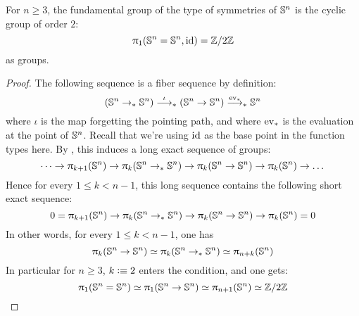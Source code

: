 \documentclass[english,a4paper]{lmcs}
\begin{document}
\begin{thm} \label{thm:fund-grp-of-symmetries}
    For $n \geq 3$, the fundamental group of the type of symmetries of ${\mathbb S^{n}}$ is the cyclic group of order $2$:
    \begin{equation}
    \uppi_{1}({\mathbb S^{n}} = {\mathbb S^{n}}, \mathord{\mathrm{id}}) = \mathbb{Z} \slash 2\mathbb{Z}
    \end{equation}
    as groups.
\end{thm}

\begin{proof}%
  The following sequence is a fiber sequence by definition:
  \begin{displaymath}
    ({\mathbb S^{n}} \to_\ast {\mathbb S^{n}}) \stackrel \iota \longrightarrow_\ast
    ({\mathbb S^{n}} \to {\mathbb S^{n}}) \stackrel {\mathrm{ev}_\ast} \longrightarrow_\ast {\mathbb S^{n}}
  \end{displaymath}
  where $\iota$ is the map forgetting the pointing path, and where $\mathrm{ev}_\ast$
  is the evaluation at the point of ${\mathbb S^{n}}$.
  Recall that we're using $\mathord{\mathrm{id}}$ as the base point in the function types here.
  By \cite[Theorem 8.4.6]{HoTT}, this
  induces a long exact sequence of groups:
  \begin{displaymath}
    \dots \to \uppi_{k+1} ({\mathbb S^{n}})
    \to \uppi_{k}({\mathbb S^{n}} \to_\ast {\mathbb S^{n}}) \to \uppi_{k}({\mathbb S^{n}} \to {\mathbb S^{n}}) \to \uppi_{k}({\mathbb S^{n}})
    \to \dots
  \end{displaymath}
  Hence for every $1\leq k < n-1$, this long sequence contains the following short exact sequence:
  \begin{displaymath}
    0 = \uppi_{k+1}({\mathbb S^{n}})
    \to \uppi_{k}({\mathbb S^{n}} \to_\ast {\mathbb S^{n}}) \to \uppi_{k}({\mathbb S^{n}} \to {\mathbb S^{n}})
    \to \uppi_{k}({\mathbb S^{n}}) = 0
  \end{displaymath}
  In other words, for every $1\leq k < n-1$, one has
  \begin{displaymath}
    \uppi_{k}({\mathbb S^{n}}\to {\mathbb S^{n}}) \simeq \uppi_{k}({\mathbb S^{n}}\to_\ast{\mathbb S^{n}}) \simeq \uppi_{n+k}({\mathbb S^{n}})
  \end{displaymath}
  In particular for $n\geq 3$, $k\vcentcolon\equiv 2$ enters the condition, and one gets:
  \begin{displaymath}
    \uppi_{1} ({\mathbb S^{n}} = {\mathbb S^{n}}) \simeq \uppi_{1} ({\mathbb S^{n}} \to {\mathbb S^{n}}) \simeq \uppi_{n+1} ({\mathbb S^{n}}) \simeq \mathbb{Z} \slash 2\mathbb{Z}\qedhere
  \end{displaymath}
\end{proof}
\end{document}
